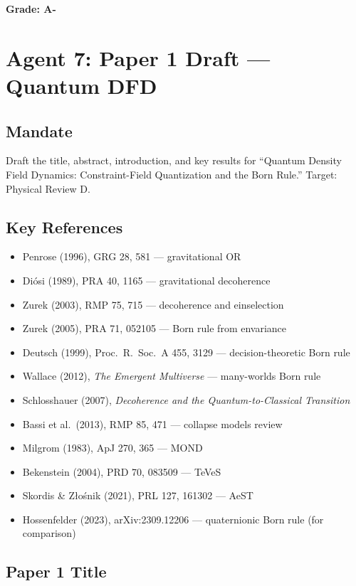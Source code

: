 \documentclass[11pt,a4paper]{article}
\begin{document}
\textbf{Grade: A-}

\section{Agent 7: Paper 1 Draft --- Quantum DFD}
\label{sec:agent7}

\subsection{Mandate}

Draft the title, abstract, introduction, and key results for ``Quantum Density Field Dynamics: Constraint-Field Quantization and the Born Rule.'' Target: Physical Review D.

\subsection{Key References}

\begin{itemize}
\item Penrose (1996), GRG 28, 581 --- gravitational OR
\item Di\'{o}si (1989), PRA 40, 1165 --- gravitational decoherence
\item Zurek (2003), RMP 75, 715 --- decoherence and einselection
\item Zurek (2005), PRA 71, 052105 --- Born rule from envariance
\item Deutsch (1999), Proc.\ R.\ Soc.\ A 455, 3129 --- decision-theoretic Born rule
\item Wallace (2012), \emph{The Emergent Multiverse} --- many-worlds Born rule
\item Schlosshauer (2007), \emph{Decoherence and the Quantum-to-Classical Transition}
\item Bassi et al.\ (2013), RMP 85, 471 --- collapse models review
\item Milgrom (1983), ApJ 270, 365 --- MOND
\item Bekenstein (2004), PRD 70, 083509 --- TeVeS
\item Skordis \& Z{\l}o\'{s}nik (2021), PRL 127, 161302 --- AeST
\item Hossenfelder (2023), arXiv:2309.12206 --- quaternionic Born rule (for comparison)
\end{itemize}

\subsection{Paper 1 Title}
\end{document}
